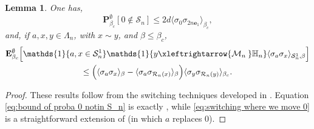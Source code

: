 \documentclass[11pt,a4paper]{article}
\numberwithin{equation}{section}
\theoremstyle{plain}
\newtheorem{Lem}[Thm]{Lemma}
\theoremstyle{definition}
\newcommand{\connect}{\xleftrightarrow}
\begin{document}
\begin{Lem} One has,
\begin{equation}\label{eq:bound of proba 0 notin S_n}
	\mathbf P_{\beta_c}^{\emptyset}[0\notin \mathcal S_n]\leq 2d\langle \sigma_0\sigma_{2n\mathbf{e}_1}\rangle_{\beta_c},
\end{equation}
and, if $a,x,y\in \Lambda_n$, with $x\sim y$, and $\beta\leq \beta_c$,
\begin{multline}\label{eq:switching where we move 0}
	\mathbf E_{\beta_c}^\emptyset\Big[\mathds{1}\{a,x\in \mathcal S_n^1\}\mathds{1}\{y\connect{\mathcal M_n\:}\mathbb H_n\}\langle \sigma_a\sigma_x\rangle_{\mathcal S_n^1,\beta}\Big]\\\leq \Big(\langle \sigma_a\sigma_x\rangle_{\beta}-\langle \sigma_a\sigma_{\mathcal R_n(x)}\rangle_{\beta}\Big)\langle \sigma_y\sigma_{\mathcal R_n(y)}\rangle_{\beta_c}.
	\end{multline}
\end{Lem}
\begin{proof} These results follow from the switching techniques developed in \cite[Lemma~2.3]{DuminilPanis2024newLB}. Equation \eqref{eq:bound of proba 0 notin S_n} is exactly \cite[Equation~(2.12)]{DuminilPanis2024newLB}, while \eqref{eq:switching where we move 0} is a straightforward extension of \cite[Equation~(2.28)]{DuminilPanis2024newLB} (in which $a$ replaces $0$).
\end{proof}
\end{document}
